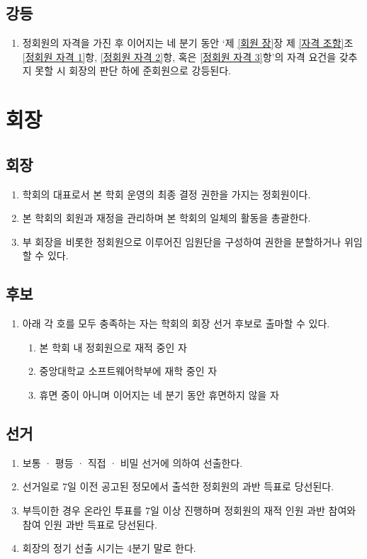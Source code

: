 \documentclass{oblivoir}
\begin{document}
\section{강등}
\begin{enumerate}
    \item 정회원의 자격을 가진 후 이어지는 네 분기 동안 `제 \ref{회원 장}장 제 \ref{자격 조항}조 \ref{정회원 자격 1}항, \ref{정회원 자격 2}항, 혹은 \ref{정회원 자격 3}항'의 자격 요건을 갖추지 못할 시 회장의 판단 하에 준회원으로 강등된다.
\end{enumerate}

\chapter{회장}

\section{회장}
\begin{enumerate}
    \item  학회의 대표로서 본 학회 운영의 최종 결정 권한을 가지는 정회원이다.
    \item  본 학회의 회원과 재정을 관리하며 본 학회의 일체의 활동을 총괄한다.
    \item  부 회장을 비롯한 정회원으로 이루어진 임원단을 구성하여 권한을 분할하거나 위임할
          수 있다.
\end{enumerate}

\section{후보}
\begin{enumerate}
    \item  아래 각 호를 모두 충족하는 자는 학회의 회장 선거 후보로 출마할 수 있다.
    \begin{enumerate}
        \item 본 학회 내 정회원으로 재적 중인 자
        \item 중앙대학교 소프트웨어학부에 재학 중인 자
        \item 휴면 중이 아니며 이어지는 네 분기 동안 휴면하지 않을 자
    \end{enumerate}
\end{enumerate}

\section{선거}
\begin{enumerate}
    \item  보통 · 평등 · 직접 · 비밀 선거에 의하여 선출한다.
    \item  선거일로 7일 이전 공고된 정모에서 출석한 정회원의 과반 득표로 당선된다.
    \item  부득이한 경우 온라인 투표를 7일 이상 진행하며 정회원의 재적 인원 과반 참여와 참여
          인원 과반 득표로 당선된다.
    \item  회장의 정기 선출 시기는 4분기 말로 한다.
\end{enumerate}
\end{document}
